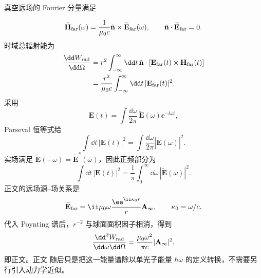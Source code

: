 \begin{derivation}
真空远场的 Fourier 分量满足

\begin{equation*}
 \widetilde{\mathbf H}_{\rm far}(\omega)
 =\frac1{\mu_0c}\hat{\mathbf n}\times
 \widetilde{\mathbf E}_{\rm far}(\omega),
 \qquad
 \hat{\mathbf n}\cdot\widetilde{\mathbf E}_{\rm far}=0.
\end{equation*}
时域总辐射能为
\begin{align*}
 \frac{\dd W_{\rm rad}}{\dd\Omega}
 &=r^2\int_{-\infty}^{\infty}\dd t\,
 \hat{\mathbf n}\cdot
 [\mathbf E_{\rm far}(t)\times\mathbf H_{\rm far}(t)]\\
 &=\frac{r^2}{\mu_0c}
 \int_{-\infty}^{\infty}\dd t\,|\mathbf E_{\rm far}(t)|^2.
\end{align*}
采用
\begin{equation*}
 \mathbf E(t)=\int\frac{\dd\omega}{2\pi}\,
 \widetilde{\mathbf E}(\omega)\ee^{-\ii\omega t},
\end{equation*}
Parseval 恒等式给
\begin{equation*}
 \int\dd t\,|\mathbf E(t)|^2
 =\int\frac{\dd\omega}{2\pi}|\widetilde{\mathbf E}(\omega)|^2.
\end{equation*}
实场满足 $\widetilde{\mathbf E}(-\omega)=\widetilde{\mathbf E}^{*}(\omega)$，因此正频部分为
\begin{equation*}
 \int\dd t\,|\mathbf E(t)|^2
 =\frac1\pi\int_0^\infty\dd\omega\,
 |\widetilde{\mathbf E}(\omega)|^2.
\end{equation*}
正文的远场源--场关系是
\begin{equation*}
 \widetilde{\mathbf E}_{\rm far}
 =\ii\mu_0\omega\frac{\ee^{\ii\kappa_0r}}{r}
 \mathbf A_\infty,
 \qquad \kappa_0=\omega/c.
\end{equation*}
代入 Poynting 谱后，$r^{-2}$ 与球面面积因子相消，得到
\begin{equation*}
 \frac{\dd^2 W_{\rm rad}}{\dd\omega\dd\Omega}
 =\frac{\mu_0\omega^2}{\pi c}|\mathbf A_\infty|^2,
\end{equation*}
即正文。正文 随后只是把这一能量谱除以单光子能量 $\hbar\omega$ 的定义转换，不需要另行引入动力学近似。
\end{derivation}

